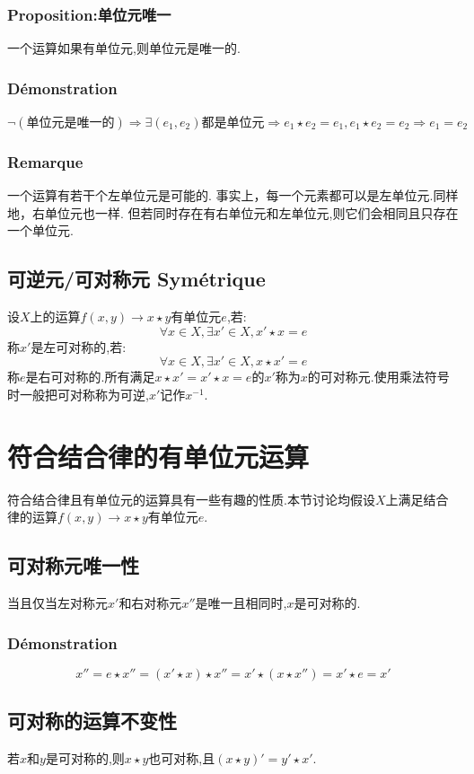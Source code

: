 \documentclass[12pt, a4paper, oneside]{ctexbook}
\begin{document}
  \subsubsection{Proposition:单位元唯一}
  一个运算如果有单位元,则单位元是唯一的.
  \subsubsection{Démonstration}
  $\lnot (\text{单位元是唯一的})\Rightarrow \exists (e_1,e_2)\text{都是单位元}\Rightarrow e_1\star e_2=e_1,e_1\star e_2=e_2\Rightarrow e_1=e_2$
  \subsubsection{Remarque}
  一个运算有若干个左单位元是可能的.
  事实上，每一个元素都可以是左单位元.同样地，右单位元也一样.
  但若同时存在有右单位元和左单位元,则它们会相同且只存在一个单位元.
  
  \subsection{可逆元/可对称元 Symétrique}
  设$X$上的运算$f(x,y)\rightarrow x\star y $有单位元$e$,若:
  $$
  \forall x\in X, \exists x'\in X,x'\star x=e
  $$
  称$x'$是左可对称的,若:
  $$
  \forall x\in X, \exists x'\in X,x\star x'=e
  $$
  称$e$是右可对称的.所有满足$x\star x'=x'\star x=e$的$x'$称为$x$的可对称元.使用乘法符号时一般把可对称称为可逆,$x'$记作$x^{-1}$.
  
  \section{符合结合律的有单位元运算}
  符合结合律且有单位元的运算具有一些有趣的性质.本节讨论均假设$X$上满足结合律的运算$f(x,y)\rightarrow x\star y $有单位元$e$.
  \subsection{可对称元唯一性}
  当且仅当左对称元$x'$和右对称元$x''$是唯一且相同时,$x$是可对称的.
  \subsubsection{Démonstration}
  $$
    x''=e\star x''=(x'\star x)\star x''=x'\star(x\star x'')=x'\star e=x'
  $$
  \subsection{可对称的运算不变性}
  若$x$和$y$是可对称的,则$x\star y$也可对称,且$(x\star y)'=y'\star x'$.
\end{document}
